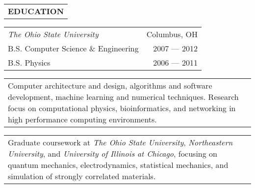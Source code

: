 \begin{tabularx}{\textwidth}{L}
    \textbf{EDUCATION}
\end{tabularx}

\begin{small}

\begin{tabularx}{\textwidth}{L R}
    \normalsize\textit{The Ohio State University} & Columbus, OH \\
    \hspace{10pt}B.S. Computer Science \& Engineering & 2007 --- 2012 \\
    \hspace{10pt}B.S. Physics & 2006 --- 2011 \\
\end{tabularx}
\begin{tabularx}{\textwidth}{X}
    \vspace{1pt}
    Computer architecture and design, algorithms and software development, machine learning and numerical techniques.
    Research focus on computational physics, bioinformatics, and networking in high performance computing environments.
\end{tabularx}
\begin{tabularx}{\textwidth}{X}
    \vspace{1pt}
    Graduate coursework at \textit{The Ohio State University}, \textit{Northeastern University}, and \textit{University of Illinois at Chicago},
    focusing on quantum mechanics, electrodynamics, statistical mechanics, and simulation of strongly correlated materials.
\end{tabularx}

\end{small}
